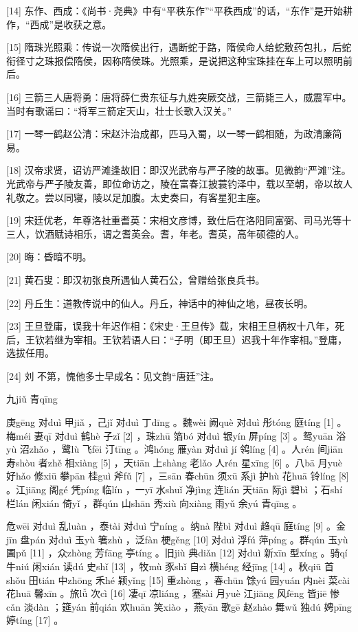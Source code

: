 \documentclass[12pt,UTF8]{ctexbook}
\begin{document}
[14] 东作、西成：《尚书·尧典》中有“平秩东作”“平秩西成”的话，“东作”是开始耕作，“西成”是收获之意。

[15] 隋珠光照乘：传说一次隋侯出行，遇断蛇于路，隋侯命人给蛇敷药包扎，后蛇衔径寸之珠报偿隋侯，因称隋侯珠。光照乘，是说把这种宝珠挂在车上可以照明前后。

[16] 三箭三人唐将勇：唐将薛仁贵东征与九姓突厥交战，三箭毙三人，威震军中。当时有歌谣曰：“将军三箭定天山，壮士长歌入汉关。”

[17] 一琴一鹤赵公清：宋赵汴治成都，匹马入蜀，以一琴一鹤相随，为政清廉简易。

[18] 汉帝求贤，诏访严滩逢故旧：即汉光武帝与严子陵的故事。见微韵“严滩”注。光武帝与严子陵友善，即位命访之，陵在富春江披蓑钓泽中，载以至朝，帝以故人礼敬之。尝以同寝，陵以足加腹。太史奏曰，有客星犯主座。

[19] 宋廷优老，年尊洛社重耆英：宋相文彦博，致仕后在洛阳同富弼、司马光等十三人，饮酒赋诗相乐，谓之耆英会。耆，年老。耆英，高年硕德的人。

[20] 晦：昏暗不明。

[21] 黄石叟：即汉初张良所遇仙人黄石公，曾赠给张良兵书。

[22] 丹丘生：道教传说中的仙人。丹丘，神话中的神仙之地，昼夜长明。

[23] 王旦登庸，误我十年迟作相：《宋史·王旦传》载，宋相王旦柄权十八年，死后，王钦若继为宰相。王钦若语人曰：“子明（即王旦）迟我十年作宰相。”登庸，选拔任用。

[24] 刘 不第，愧他多士早成名：见文韵“唐廷”注。





九jiǔ 青qīng


庚gēng 对duì 甲jiǎ ，己jǐ 对duì 丁dīng 。魏wèi 阙què 对duì 彤tóng 庭tíng [1] 。梅méi 妻qī 对duì 鹤hè 子zǐ [2] ，珠zhū 箔bó 对duì 银yín 屏píng [3] 。鸳yuān 浴yù 沼zhǎo ，鹭lù 飞fēi 汀tīng 。鸿hóng 雁yàn 对duì jí 鸰líng [4] 。人rén 间jiān 寿shòu 者zhě 相xiàng [5] ，天tiān 上shàng 老lǎo 人rén 星xīng [6] 。八bā 月yuè 好hǎo 修xiū 攀pān 桂guì 斧fǔ [7] ，三sān 春chūn 须xū 系jì 护hù 花huā 铃líng [8] 。江jiāng 阁gé 凭píng 临lín ，一yī 水shuǐ 净jìng 连lián 天tiān 际jì 碧bì ；石shí 栏lán 闲xián 倚yǐ ，群qún 山shān 秀xiù 向xiàng 雨yǔ 余yú 青qīng 。

危wēi 对duì 乱luàn ，泰tài 对duì 宁níng 。纳nà 陛bì 对duì 趋qū 庭tíng [9] 。金jīn 盘pán 对duì 玉yù 箸zhù ，泛fàn 梗gěng [10] 对duì 浮fú 萍píng 。群qún 玉yù 圃pǔ [11] ，众zhòng 芳fāng 亭tíng 。旧jiù 典diǎn [12] 对duì 新xīn 型xíng 。骑qí 牛niú 闲xián 读dú 史shǐ [13] ，牧mù 豕shǐ 自zì 横héng 经jīng [14] 。秋qiū 首shǒu 田tián 中zhōng 禾hé 颖yǐng [15] 重zhòng ，春chūn 馀yú 园yuán 内nèi 菜cài 花huā 馨xīn 。旅lǚ 次cì [16] 凄qī 凉liáng ，塞sài 月yuè 江jiāng 风fēng 皆jiē 惨cǎn 淡dàn ；筵yán 前qián 欢huān 笑xiào ，燕yān 歌gē 赵zhào 舞wǔ 独dú 娉pīng 婷tíng [17] 。
\end{document}
